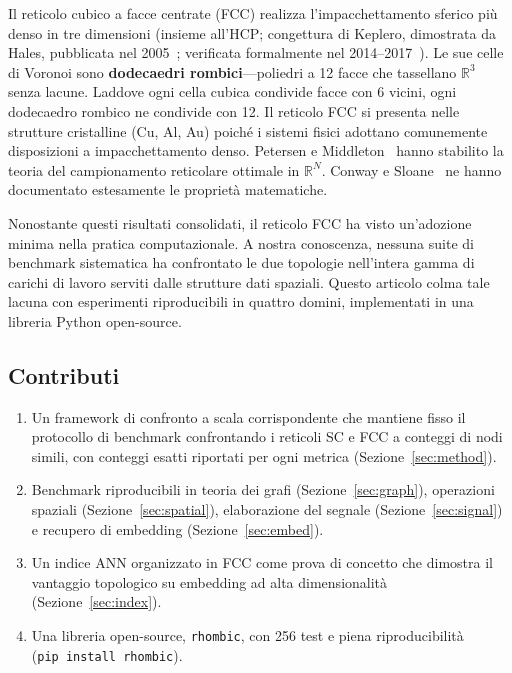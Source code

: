 \documentclass[11pt]{article}
\begin{document}
Il reticolo cubico a facce centrate (FCC) realizza l'impacchettamento
sferico pi\`u denso in tre dimensioni (insieme all'HCP; congettura di
Keplero, dimostrata da Hales, pubblicata nel 2005~\cite{hales2005};
verificata formalmente nel 2014--2017~\cite{hales2017}). Le sue celle
di Voronoi sono \textbf{dodecaedri rombici}---poliedri a 12 facce che
tassellano $\mathbb{R}^3$ senza lacune. Laddove ogni cella cubica
condivide facce con 6 vicini, ogni dodecaedro rombico ne condivide con
12. Il reticolo FCC si presenta nelle strutture cristalline (Cu, Al, Au)
poich\'e i sistemi fisici adottano comunemente disposizioni a
impacchettamento denso. Petersen e Middleton~\cite{petersen1962} hanno
stabilito la teoria del campionamento reticolare ottimale in
$\mathbb{R}^N$. Conway e Sloane~\cite{conway1999} ne hanno documentato
estesamente le propriet\`a matematiche.

Nonostante questi risultati consolidati, il reticolo FCC ha visto
un'adozione minima nella pratica computazionale. A nostra conoscenza,
nessuna suite di benchmark sistematica ha confrontato le due topologie
nell'intera gamma di carichi di lavoro serviti dalle strutture dati
spaziali. Questo articolo colma tale lacuna con esperimenti riproducibili
in quattro domini, implementati in una libreria Python open-source.

\subsection{Contributi}

\begin{enumerate}
  \item Un framework di confronto a scala corrispondente che mantiene
    fisso il protocollo di benchmark confrontando i reticoli SC e FCC a
    conteggi di nodi simili, con conteggi esatti riportati per ogni
    metrica (Sezione~\ref{sec:method}).
  \item Benchmark riproducibili in teoria dei grafi
    (Sezione~\ref{sec:graph}), operazioni spaziali
    (Sezione~\ref{sec:spatial}), elaborazione del segnale
    (Sezione~\ref{sec:signal}) e recupero di embedding
    (Sezione~\ref{sec:embed}).
  \item Un indice ANN organizzato in FCC come prova di concetto che
    dimostra il vantaggio topologico su embedding ad alta dimensionalit\`a
    (Sezione~\ref{sec:index}).
  \item Una libreria open-source, \texttt{rhombic}, con 256 test
    e piena riproducibilit\`a (\texttt{pip~install~rhombic}).
\end{enumerate}
\end{document}
